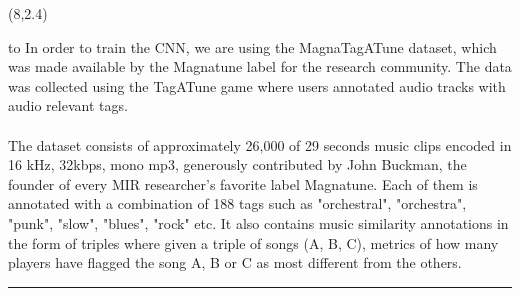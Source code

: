 \documentclass[a0]{a0poster}
\def\Head#1{
  \noindent\hbox to \hsize{\hfil{\LARGE\color{DarkBlue}\sf #1}}\bigskip}
\begin{document}
  \begin{textblock}{7}(8,2.4)
    \Head{Dataset}
    \sf
    In order to train the CNN, we are using the MagnaTagATune dataset, which
    was made available by the Magnatune label for the research community. The
    data was collected using the TagATune game where users annotated audio
    tracks with audio relevant tags.
    \\ \\
    The dataset consists of approximately 26,000 of 29 seconds music clips
    encoded in 16 kHz, 32kbps, mono mp3, generously contributed by John
    Buckman, the founder of every MIR researcher's favorite label Magnatune.
    Each of them is annotated with a combination of 188 tags such as "orchestral",
    "orchestra", "punk", "slow", "blues", "rock" etc. It also contains music
    similarity annotations in the form of triples where given a triple of songs
    (A, B, C), metrics of how many players have flagged the song A, B or C as
    most different from the others.

    \bigskip
    \hrule
  \end{textblock}
\end{document}
